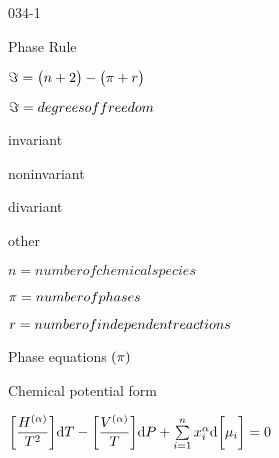 \begin{mitframe}{034-1} 
    
\begin{listone}
    
    \item Phase Rule
    
    \begin{listtwo}
    
    	\item $\dof=\big(n+2\big)-\big(\pie+\pos\big)$
    
    	\begin{listthree}
		
        	\item $\dof=degrees of freedom$
            
            \begin{listfour}

				\item invariant
            
            	\item noninvariant
            
            	\item divariant
                
                \item other

			\end{listfour}

			\item $n= number of chemical species$
            
            \item $\pie=number of phases$
            
            \item $\pos=number of independent reactions$

		\end{listthree}     
    
    \end{listtwo}
    
    \item Phase equations $(\pie)$
    
    \begin{listtwo}

    	\item Chemical potential form

      	\begin{listthree}
            
            \item $\bigg[\dfrac{\enthalpy^{(\tdiff)}}{\Temp^2}\bigg]\mathrm{d}\Temp-\bigg[\dfrac{\vol^{(\tdiff)}}{\Temp}\bigg]\mathrm{d}\p+\sum\limits^{n}_{i=1}\specfrac{i}^{\tdiff}\mathrm{d}\bigg[\chempot_{i}\bigg]=0$          


\end{listthree}
\end{listtwo}
\end{listone}
\end{mitframe}
